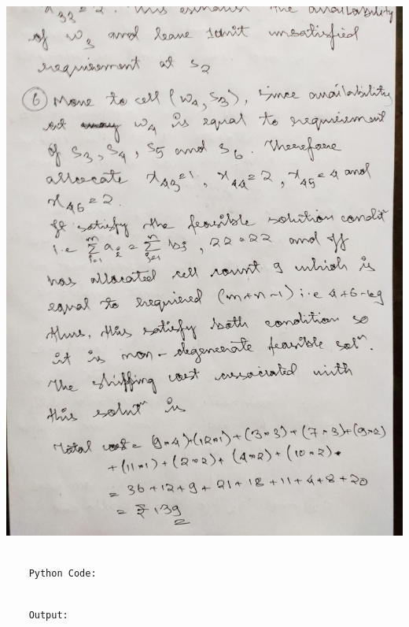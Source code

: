 \documentclass[12pt, letterpaper, twoside]{book}
\begin{document}
\includegraphics[width=\paperwidth, height=\paperheight]{Page12}
\begin{lstlisting}

	Python Code:

\end{lstlisting}

\pagebreak
\begin{lstlisting}

	Output:

\end{lstlisting}
\end{document}
